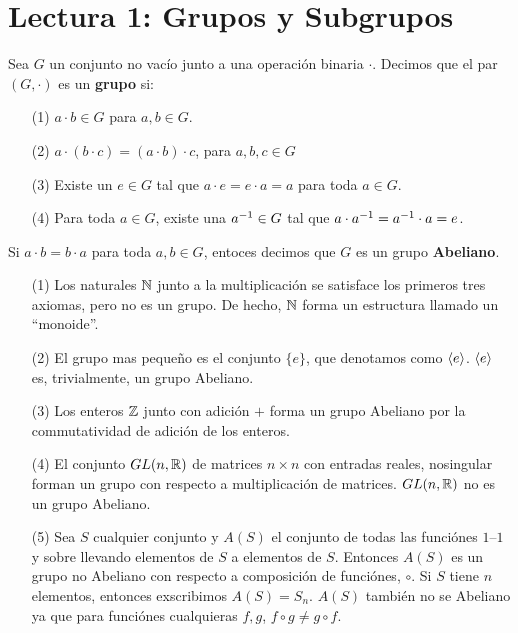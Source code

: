 \section*{Lectura 1: Grupos y Subgrupos}

\begin{definition}
    Sea $G$ un conjunto no vac\'io junto a una operaci\'on binaria  $\cdot$.
    Decimos que el par  $(G,\cdot)$ es un \textbf{grupo} si:
    \begin{enumerate}
        \item[(1)] $a \cdot b \in G$ para $a,b \in G$.

        \item[(2)] $a \cdot (b \cdot c)= (a \cdot b) \cdot c$, para $a,b,c \in G$

        \item[(3)] Existe un $e \in G$ tal que  $a \cdot e=e \cdot a=a$ para
            toda  $a \in G$.

        \item [(4)] Para toda $a \in G$, existe una  $a^{-1} \in G$ tal que $a
            \cdot a^{-1}=a^{-1} \cdot a=e$.
    \end{enumerate}
    Si $a \cdot b = b \cdot a$ para toda  $a,b \in G$, entoces decimos que  $G$
    es un grupo  \textbf{Abeliano}.
\end{definition}

\begin{example}\label{example_1}
    \begin{enumerate}
        \item[(1)] Los naturales $\mathbb{N}$ junto a la multiplicaci\'on se satisface
            los primeros tres axiomas, pero no es un grupo. De hecho, $\mathbb{N}$ forma
            un estructura llamado un ``monoide''.

        \item[(2)] El grupo mas peque\~no es el conjunto $\{e\}$, que denotamos
            como $\langle e\rangle$. $\langle e\rangle$ es, trivialmente, un grupo Abeliano.

        \item[(3)] Los enteros $\mathbb{Z}$ junto con adici\'on  $+$ forma un grupo
            Abeliano por la commutatividad de adici\'on de los enteros.

        \item[(4)] El conjunto $GL(n,\mathbb{R})$ de matrices $n \times n$ con entradas
            reales, nosingular forman un grupo con respecto a multiplicaci\'on
            de matrices. $GL(n,\mathbb{R})$ no es un grupo Abeliano.

        \item[(5)] Sea $S$ cualquier conjunto y  $A(S)$ el conjunto de todas las
            funci\'ones $1$--$1$ y sobre llevando elementos de $S$ a elementos de
             $S$. Entonces  $A(S)$ es un grupo no Abeliano con respecto a
            composici\'on de funci\'ones, $\circ$. Si $S$ tiene  $n$ elementos,
            entonces exscribimos $A(S)=S_n$. $A(S)$ tambi\'en no se Abeliano ya
            que para funci\'ones cualquieras $f,g$,  $f \circ g \neq g \circ f$.
    \end{enumerate}
\end{example}

